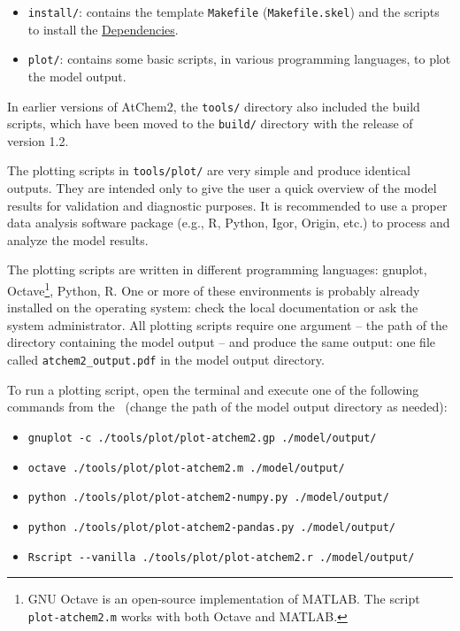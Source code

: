 \begin{itemize}
\item \texttt{install/}: contains the template \texttt{Makefile} (\texttt{Makefile.skel}) and
  the scripts to install the \hyperref[sec:dependencies]{Dependencies}.
\item \texttt{plot/}: contains some basic scripts, in various programming languages, to plot
  the model output.
\end{itemize}

In earlier versions of AtChem2, the \texttt{tools/} directory also included the build scripts,
which have been moved to the \texttt{build/} directory with the release of version 1.2.

The plotting scripts in \texttt{tools/plot/} are very simple and produce identical
outputs. They are intended only to give the user a quick overview of the model results for
validation and diagnostic purposes. It is recommended to use a proper data analysis software
package (e.g., R, Python, Igor, Origin, etc.) to process and analyze the model results.

The plotting scripts are written in different programming languages: gnuplot,
Octave\footnote{GNU Octave is an open-source implementation of MATLAB. The script
  \texttt{plot-atchem2.m} works with both Octave and MATLAB.}, Python, R. One or more of these
environments is probably already installed on the operating system: check the local
documentation or ask the system administrator. All plotting scripts require one argument -- the
path of the directory containing the model output -- and produce the same output: one file
called \texttt{atchem2\_output.pdf} in the model output directory.

To run a plotting script, open the terminal and execute one of the following commands from the
\maindir\ (change the path of the model output directory as needed):

\begin{itemize}
\item \verb|gnuplot -c ./tools/plot/plot-atchem2.gp ./model/output/|
\item \verb|octave ./tools/plot/plot-atchem2.m ./model/output/|
\item \verb|python ./tools/plot/plot-atchem2-numpy.py ./model/output/|
\item \verb|python ./tools/plot/plot-atchem2-pandas.py ./model/output/|
\item \verb|Rscript --vanilla ./tools/plot/plot-atchem2.r ./model/output/|
\end{itemize}

